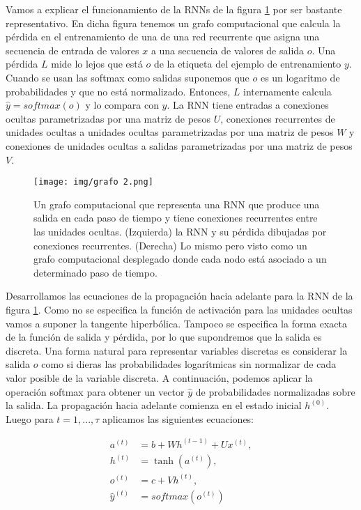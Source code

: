         Vamos a explicar el funcionamiento de la RNNs de la figura \ref{grafo:rnn2} por ser bastante representativo. En dicha figura tenemos un grafo computacional que calcula la pérdida en el entrenamiento de una de una red recurrente que asigna una secuencia de entrada de valores $x$ a una secuencia de valores de salida $o$. Una pérdida $L$ mide lo lejos que está $o$ de la etiqueta del ejemplo de entrenamiento $y$. Cuando se usan las softmax como salidas suponemos que $o$ es un logaritmo de probabilidades y que no está normalizado. Entonces, $L$ internamente calcula $\hat{y} = softmax(o)$ y lo compara con $y$. La RNN tiene entradas a conexiones ocultas parametrizadas por una matriz de pesos $U$, conexiones recurrentes de unidades ocultas a unidades ocultas parametrizadas por una matriz de pesos $W$ y conexiones de unidades ocultas a salidas parametrizadas por una matriz de pesos $V$. \\
            
            
            \begin{figure}[ht]
                \centering
                \texttt{[image: img/grafo 2.png]}
                \caption{Un grafo computacional que representa una RNN que produce una salida en cada paso de tiempo y tiene conexiones recurrentes entre las unidades ocultas. (Izquierda) la RNN y su pérdida dibujadas por conexiones recurrentes. (Derecha) Lo mismo pero visto como un grafo computacional desplegado donde cada nodo está asociado a un determinado paso de tiempo. }
                \label{grafo:rnn2}
            \end{figure}
            
        Desarrollamos las ecuaciones de la propagación hacia adelante para la RNN de la figura \ref{grafo:rnn2}. Como no se especifica la función de activación para las unidades ocultas vamos a suponer la tangente hiperbólica. Tampoco se especifica la forma exacta de la función de salida y pérdida, por lo que supondremos que la salida es discreta. Una forma natural para representar variables discretas es considerar la salida $o$ como si dieras las probabilidades logarítmicas sin normalizar de cada valor posible de la variable discreta. A continuación, podemos aplicar la operación softmax para obtener un vector $\hat{y}$ de probabilidades normalizadas sobre la salida. La propagación hacia adelante comienza en el estado inicial $h^{(0)}$. Luego para $t=1,...,\tau$ aplicamos las siguientes ecuaciones: 
        
            \begin{align}
                a^{(t)} &= b + Wh^{(t-1)} + Ux^{(t)},\\
                h^{(t)} &= \tanh{(a^{(t)})}, \\
                o^{(t)} &= c + Vh^{(t)}, \\
                \hat{y}^{(t)} &= softmax(o^{(t)})
            \end{align}
                


